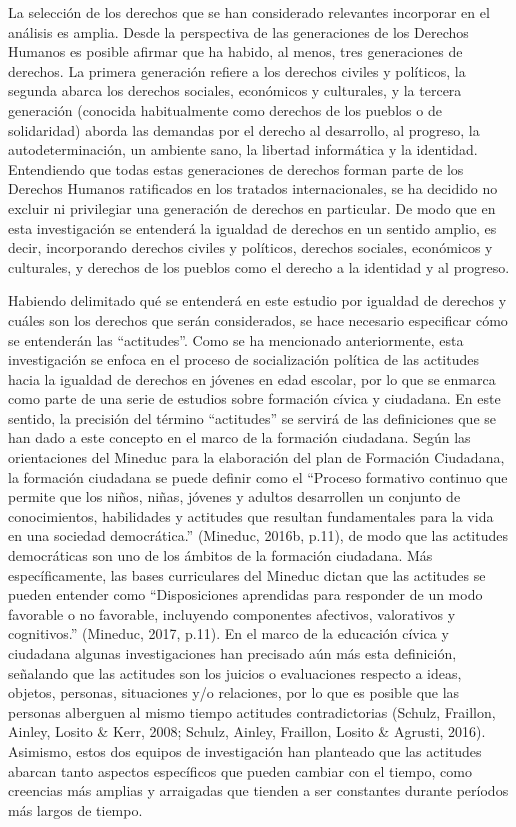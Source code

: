 \documentclass[12pt,twoside]{templates/facsothesis}
\begin{document}
La selección de los derechos que se han considerado relevantes incorporar en el análisis es amplia. Desde la perspectiva de las generaciones de los Derechos Humanos es posible afirmar que ha habido, al menos, tres generaciones de derechos. La primera generación refiere a los derechos civiles y políticos, la segunda abarca los derechos sociales, económicos y culturales, y la tercera generación (conocida habitualmente como derechos de los pueblos o de solidaridad) aborda las demandas por el derecho al desarrollo, al progreso, la autodeterminación, un ambiente sano, la libertad informática y la identidad. Entendiendo que todas estas generaciones de derechos forman parte de los Derechos Humanos ratificados en los tratados internacionales, se ha decidido no excluir ni privilegiar una generación de derechos en particular. De modo que en esta investigación se entenderá la igualdad de derechos en un sentido amplio, es decir, incorporando derechos civiles y políticos, derechos sociales, económicos y culturales, y derechos de los pueblos como el derecho a la identidad y al progreso.

Habiendo delimitado qué se entenderá en este estudio por igualdad de derechos y cuáles son los derechos que serán considerados, se hace necesario especificar cómo se entenderán las ``actitudes''. Como se ha mencionado anteriormente, esta investigación se enfoca en el proceso de socialización política de las actitudes hacia la igualdad de derechos en jóvenes en edad escolar, por lo que se enmarca como parte de una serie de estudios sobre formación cívica y ciudadana. En este sentido, la precisión del término ``actitudes'' se servirá de las definiciones que se han dado a este concepto en el marco de la formación ciudadana. Según las orientaciones del Mineduc para la elaboración del plan de Formación Ciudadana, la formación ciudadana se puede definir como el ``Proceso formativo continuo que permite que los niños, niñas, jóvenes y adultos desarrollen un conjunto de conocimientos, habilidades y actitudes que resultan fundamentales para la vida en una sociedad democrática.'' (Mineduc, 2016b, p.11), de modo que las actitudes democráticas son uno de los ámbitos de la formación ciudadana. Más específicamente, las bases curriculares del Mineduc dictan que las actitudes se pueden entender como ``Disposiciones aprendidas para responder de un modo favorable o no favorable, incluyendo componentes afectivos, valorativos y cognitivos.'' (Mineduc, 2017, p.11). En el marco de la educación cívica y ciudadana algunas investigaciones han precisado aún más esta definición, señalando que las actitudes son los juicios o evaluaciones respecto a ideas, objetos, personas, situaciones y/o relaciones, por lo que es posible que las personas alberguen al mismo tiempo actitudes contradictorias (Schulz, Fraillon, Ainley, Losito \& Kerr, 2008; Schulz, Ainley, Fraillon, Losito \& Agrusti, 2016). Asimismo, estos dos equipos de investigación han planteado que las actitudes abarcan tanto aspectos específicos que pueden cambiar con el tiempo, como creencias más amplias y arraigadas que tienden a ser constantes durante períodos más largos de tiempo.
\end{document}
